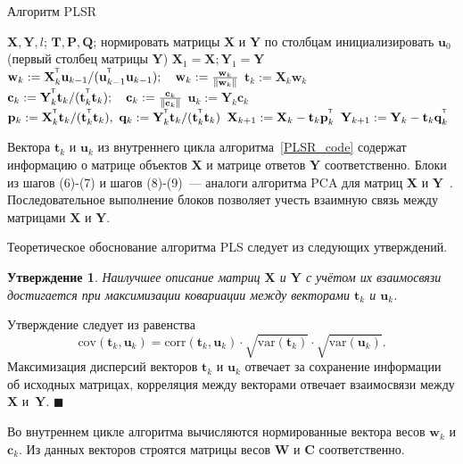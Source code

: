 \documentclass[12pt,twoside]{article}
\newtheorem{statement}{Утверждение}
\newcommand{\bw}{\mathbf{w}}
\newcommand{\bY}{\mathbf{Y}}
\newcommand{\bX}{\mathbf{X}}
\newcommand{\bu}{\mathbf{u}}
\newcommand{\bt}{\mathbf{t}}
\newcommand{\bp}{\mathbf{p}}
\newcommand{\bq}{\mathbf{q}}
\newcommand{\bc}{\mathbf{c}}
\newcommand{\bP}{\mathbf{P}}
\newcommand{\bT}{\mathbf{T}}
\newcommand{\bQ}{\mathbf{Q}}
\newcommand{\bC}{\mathbf{C}}
\newcommand{\bW}{\mathbf{W}}
\newcommand{\T}{^{\text{\tiny\sffamily\upshape\mdseries T}}}
\begin{document}
\begin{algorithm}[h]
\caption{Алгоритм PLSR}
\label{PLSR_code}
\begin{algorithmic}[1]
	\REQUIRE $\bX, \bY, l$;
	\ENSURE $\bT, \bP, \bQ$;
	\STATE нормировать матрицы $\bX$ и $\bY$ по столбцам
	\STATE инициализировать $\bu_0$ (первый столбец матрицы $\bY$)
	\STATE $\bX_1 = \bX; \bY_1 = \bY$
	\REPEAT
	\vspace{0.1cm}
	\STATE $\bw_k := \bX_k^{\T} \bu_{k-1} / (\bu_{k-1}^{\T} \bu_{k-1}); \quad \bw_k: = \frac{\bw_k}{\| \bw_k \|}$
	\vspace{0.1cm}
	\STATE $\bt_k := \bX_k \bw_k$
	\vspace{0.1cm}
	\STATE $\bc_k := \bY_k^{\T} \bt_k / (\bt_k^{\T} \bt_k); \quad \bc_k: = \frac{\bc_k}{\| \bc_k \|}$
	\vspace{0.1cm}
	\STATE $\bu_k := \bY_k \bc_k$
	\UNTIL{$\bt_k$ не стабилизируется}
	\vspace{0.1cm}
	\STATE $\bp_k:= \bX_k^{\T}\bt_k/(\bt_k^{\T}\bt_k),\ 
	\bq_k := \bY_k^{\T}\bt_k/(\bt_k^{\T}\bt_k)$
	\vspace{0.2cm}
	\STATE $\bX_{k+1} :=  \bX_k - \bt_k \bp_k^{\T}$
	\vspace{0.2cm}
	\STATE $\bY_{k + 1} :=  \bY_k - \bt_k \bq_k^{\T}$ 
	\ENDFOR
\end{algorithmic}
\end{algorithm}
Вектора $\bt_k$ и $\bu_k$ из внутреннего цикла алгоритма~\ref{PLSR_code}
содержат информацию о матрице объектов $\bX$ и матрице ответов $\bY$ соответственно. 
Блоки из шагов (6)-(7) и шагов (8)-(9)~--- аналоги алгоритма PCA для матриц $\bX$ и $\bY$~\cite{geladi1986partial}. 
Последовательное выполнение блоков позволяет учесть взаимную связь между матрицами $\bX$ и $\bY$.

Теоретическое обоснование алгоритма PLS следует из следующих утверждений.
\begin{statement}
Наилучшее описание матриц $\bX$ и $\bY$ с учётом их взаимосвязи достигается при максимизации ковариации между векторами $\bt_k$ и $\bu_k$. 
\end{statement}
Утверждение следует из равенства
\[
\text{cov} (\bt_k, \bu_k) = \text{corr} (\bt_k, \bu_k) \cdot \sqrt{\text{var}(\bt_k)} \cdot \sqrt{\text{var}(\bu_k)}.
\]
Максимизация дисперсий векторов $\bt_k$ и $\bu_k$ отвечает за сохранение информации об исходных матрицах, 
корреляция между векторами отвечает взаимосвязи между $\bX$ и~$\bY$. $\blacksquare$

Во внутреннем цикле алгоритма вычисляются нормированные вектора весов $\bw_k$ и $\bc_k$. Из данных векторов строятся матрицы весов $\bW$ и $\bC$ соответственно.
\end{document}
